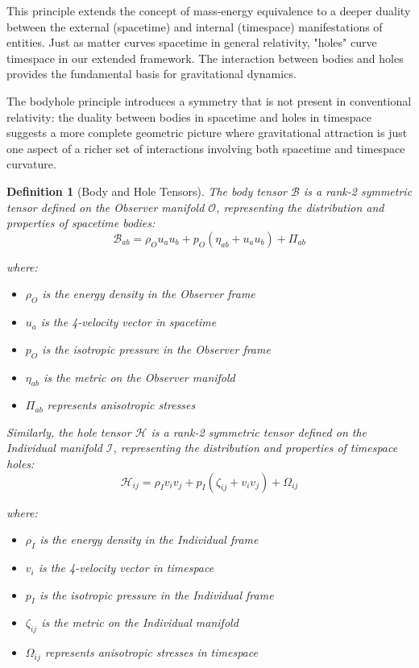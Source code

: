 \documentclass{article}
\newtheorem{definition}{Definition}
\begin{document}
This principle extends the concept of mass-energy equivalence to a deeper duality between the external (spacetime) and internal (timespace) manifestations of entities. Just as matter curves spacetime in general relativity, "holes" curve timespace in our extended framework. The interaction between bodies and holes provides the fundamental basis for gravitational dynamics.

The bodyhole principle introduces a symmetry that is not present in conventional relativity: the duality between bodies in spacetime and holes in timespace suggests a more complete geometric picture where gravitational attraction is just one aspect of a richer set of interactions involving both spacetime and timespace curvature.

\begin{definition}[Body and Hole Tensors]
The body tensor $\mathcal{B}$ is a rank-2 symmetric tensor defined on the Observer manifold $\mathcal{O}$, representing the distribution and properties of spacetime bodies:
\begin{equation}
\mathcal{B}_{ab} = \rho_O u_a u_b + p_O(\eta_{ab} + u_a u_b) + \Pi_{ab}
\end{equation}

where:
\begin{itemize}
\item $\rho_O$ is the energy density in the Observer frame
\item $u_a$ is the 4-velocity vector in spacetime
\item $p_O$ is the isotropic pressure in the Observer frame
\item $\eta_{ab}$ is the metric on the Observer manifold
\item $\Pi_{ab}$ represents anisotropic stresses
\end{itemize}

Similarly, the hole tensor $\mathcal{H}$ is a rank-2 symmetric tensor defined on the Individual manifold $\mathcal{I}$, representing the distribution and properties of timespace holes:
\begin{equation}
\mathcal{H}_{ij} = \rho_I v_i v_j + p_I(\zeta_{ij} + v_i v_j) + \Omega_{ij}
\end{equation}

where:
\begin{itemize}
\item $\rho_I$ is the energy density in the Individual frame
\item $v_i$ is the 4-velocity vector in timespace
\item $p_I$ is the isotropic pressure in the Individual frame
\item $\zeta_{ij}$ is the metric on the Individual manifold
\item $\Omega_{ij}$ represents anisotropic stresses in timespace
\end{itemize}
\end{definition}
\end{document}
